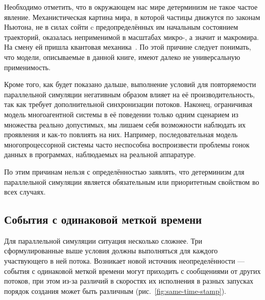 \begin{digression}
Необходимо отметить, что в окружающем нас мире детерминизм не такое частое явление. Механистическая картина мира, в которой частицы движутся по законам Ньютона, не в силах сойти c предопределённых им начальным состоянием траекторий, оказалась неприменимой в масштабах микро-, а значит и макромира. На смену ей пришла квантовая механика~\cite{ivanov-theorphys}. По этой причине следует понимать, что модели, описываемые в данной книге, имеют далеко не универсальную применимость.

Кроме того, как будет показано дальше, выполнение условий для повторяемости параллельной симуляции негативным образом влияет на её производительность, так как требует дополнительной синхронизации потоков. Наконец, ограничивая модель многоагентной системы в её поведении только одним сценарием из множества реально допустимых, мы лишаем себя возможности наблюдать их проявления и как-то повлиять на них. Например, последовательная модель многопроцессорной системы часто неспособна воспроизвести проблемы гонок данных в программах, наблюдаемых на реальной аппаратуре.

По этим причинам нельзя с определённостью заявлять, что детерминизм для параллельной симуляции является обязательным или приоритетным свойством во всех случаях.

\end{digression}

\subsection{События с одинаковой меткой времени}

Для параллельной симуляции ситуация несколько сложнее. Три сформулированные выше условия должны выполняться для каждого участвующего в ней потока. Возникает новой источник неопределённости --- события с одинаковой меткой времени могут приходить с сообщениями от других потоков, при этом из-за различий в скоростях их исполнения в разных запусках порядок создания может быть различным (рис.~\ref{fig:same-time-stamp}). 

